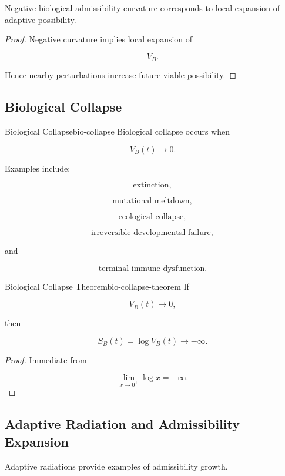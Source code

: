 \documentclass[12pt,twoside,openright]{book}
\newenvironment{prop}
{\begin{proposition}{}{}}
{\end{proposition}}
\begin{document}
\begin{prop}
Negative biological admissibility curvature corresponds
to local expansion of adaptive possibility.
\end{prop}

\begin{proof}
Negative curvature implies local expansion of

\[
V_B.
\]

Hence nearby perturbations increase future viable
possibility.
\end{proof}

\subsection{ Biological Collapse}

\begin{definition}{Biological Collapse}{bio-collapse}
Biological collapse occurs when

\[
V_B(t)
\rightarrow0.
\]
\end{definition}

Examples include:

\[
\text{extinction},
\]

\[
\text{mutational meltdown},
\]

\[
\text{ecological collapse},
\]

\[
\text{irreversible developmental failure},
\]

and

\[
\text{terminal immune dysfunction}.
\]

\begin{theorem}{Biological Collapse Theorem}{bio-collapse-theorem}
If

\[
V_B(t)\rightarrow0,
\]

then

\[
S_B(t)
=
\log V_B(t)
\rightarrow
-\infty.
\]
\end{theorem}

\begin{proof}
Immediate from

\[
\lim_{x\to0^+}\log x=-\infty.
\]
\end{proof}

\subsection{ Adaptive Radiation and Admissibility Expansion}

Adaptive radiations provide examples of admissibility
growth.
\end{document}

